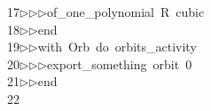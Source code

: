 \begin{tabbing}
17\>$\triangleright$\>$\triangleright$\>$\triangleright$\>of\_one\_polynomial\ R\ cubic\ \\[0pt]
18\>$\triangleright$\>$\triangleright$\>end\ \\[0pt]
19\>$\triangleright$\>$\triangleright$\>with\ Orb\ do\ orbits\_activity\ \\[0pt]
20\>$\triangleright$\>$\triangleright$\>$\triangleright$\>export\_something\ orbit\ 0\ \\[0pt]
21\>$\triangleright$\>$\triangleright$\>end\\[0pt]
22\>\end{tabbing}
